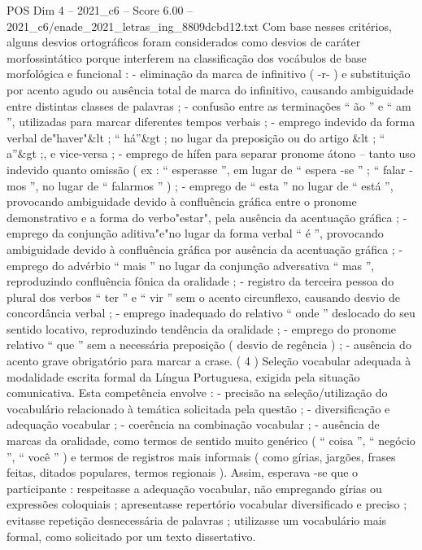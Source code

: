 \begin{textsample}{POS Dim 4 – 2021\_c6 – Score 6.00 – 2021\_c6/enade\_2021\_letras\_ing\_8809dcbd12.txt}
Com base nesses critérios, alguns desvios ortográficos foram considerados como desvios de caráter morfossintático porque interferem na classificação dos vocábulos de base morfológica e funcional : - eliminação da marca de infinitivo ( -r- ) e substituição por acento agudo ou ausência total de marca do infinitivo, causando ambiguidade entre distintas classes de palavras ; - confusão entre as terminações “ ão ” e “ am ”, utilizadas para marcar diferentes tempos verbais ; - emprego indevido da forma verbal de"haver"\&lt ; “ há”\&gt ; no lugar da preposição ou do artigo \&lt ; “ a”\&gt ;, e vice-versa ; - emprego de hífen para separar pronome átono – tanto uso indevido quanto omissão ( ex : “ esperasse ”, em lugar de “ espera -se ” ; “ falar -mos ”, no lugar de “ falarmos ” ) ; - emprego de “ esta ” no lugar de “ está ”, provocando ambiguidade devido à confluência gráfica entre o pronome demonstrativo e a forma do verbo"estar", pela ausência da acentuação gráfica ; - emprego da conjunção aditiva"e"no lugar da forma verbal “ é ”, provocando ambiguidade devido à confluência gráfica por ausência da acentuação gráfica ; - emprego do advérbio “ mais ” no lugar da conjunção adversativa “ mas ”, reproduzindo confluência fônica da oralidade ; - registro da terceira pessoa do plural dos verbos “ ter ” e “ vir ” sem o acento circunflexo, causando desvio de concordância verbal ; - emprego inadequado do relativo “ onde ” deslocado do seu sentido locativo, reproduzindo tendência da oralidade ; - emprego do pronome relativo “ que ” sem a necessária preposição ( desvio de regência ) ; - ausência do acento grave obrigatório para marcar a crase. ( 4 ) Seleção vocabular adequada à modalidade escrita formal da Língua Portuguesa, exigida pela situação comunicativa.
Esta competência envolve : - precisão na seleção/utilização do vocabulário relacionado à temática solicitada pela questão ; - diversificação e adequação vocabular ; - coerência na combinação vocabular ; - ausência de marcas da oralidade, como termos de sentido muito genérico ( “ coisa ”, “ negócio ”, “ você ” ) e termos de registros mais informais ( como gírias, jargões, frases feitas, ditados populares, termos regionais ).
Assim, esperava -se que o participante : respeitasse a adequação vocabular, não empregando gírias ou expressões coloquiais ; apresentasse repertório vocabular diversificado e preciso ; evitasse repetição desnecessária de palavras ; utilizasse um vocabulário mais formal, como solicitado por um texto dissertativo.

\end{textsample}
